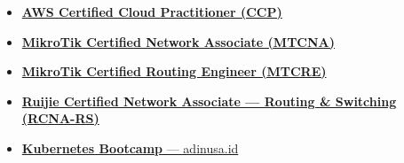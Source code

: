 \begin{itemize}
  \item \href{https://www.credly.com/badges/f6343257-05ea-47ec-ba96-c2eaa7996bf1}{\textbf{AWS Certified Cloud Practitioner (CCP)}}
  \item \href{https://mikrotik.com/training/certificates/c718167cdeb7ed58514a}{\textbf{MikroTik Certified Network Associate (MTCNA)}}
  \item \href{https://mikrotik.com/training/certificates/c721407cc714d0352754}{\textbf{MikroTik Certified Routing Engineer (MTCRE)}}
  \item \href{https://www.linkedin.com/in/eric-julianto/overlay/Certifications/1216277271/treasury/?profileId=ACoAAFSJB6ABj2umTaBp_Y5x3AKPJfZPPteGLpE}{\textbf{Ruijie Certified Network Associate --- Routing \& Switching (RCNA-RS)}}
  \item \href{https://adinusa.id/course/publisher/show/d3b7d4c6-030f-4b6c-b840-ba41d971dabe}{\textbf{Kubernetes Bootcamp} --- adinusa.id}
\end{itemize}
